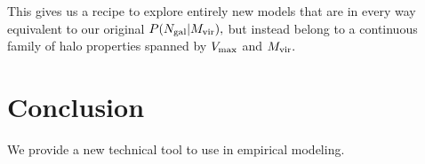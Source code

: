 \documentclass[usenatbib,usegraphicx,letterpaper]{mn2e}
\newcommand{\Ngal}{N_{\rm gal}}
\newcommand{\vmax}{V_{\rm max}}
\newcommand{\mvir}{M_{\rm vir}}
\begin{document}
This gives us a recipe to explore entirely new models that are in every way equivalent to our original $P(\Ngal | \mvir),$ but instead belong to a continuous family of halo properties spanned by $\vmax$ and $\mvir.$

\section{Conclusion}

We provide a new technical tool to use in empirical modeling. 


\end{document}

